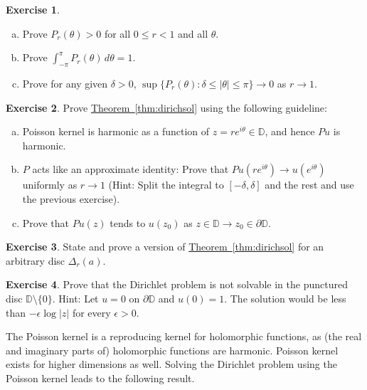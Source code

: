 \documentclass[12pt,openany]{book}
\newcommand{\sabs}[1]{\lvert {#1} \rvert}
\newcommand{\abs}[1]{\left\lvert {#1} \right\rvert}
\newcommand{\D}{{\mathbb{D}}}
\theoremstyle{plain}
\theoremstyle{remark}
\theoremstyle{definition}
\newenvironment{exbox}{%
    \def\FrameCommand{\vrule width 1pt \relax\hspace{10pt}}%
    \MakeFramed {\advance \hsize -\width \FrameRestore}%
}{%
    \endMakeFramed
}
\newenvironment{exparts}{%
    \leavevmode\begin{enumerate}[a),noitemsep,topsep=0pt,parsep=0pt,partopsep=0pt]
}{%
    \end{enumerate}
}
\theoremstyle{exercise}
\newtheorem{exercise}{Exercise}[section]
\theoremstyle{example}
\newcommand{\thmref}[1]{\hyperref[#1]{Theorem~\ref*{#1}}}
\begin{document}
\begin{exbox}
\begin{exercise}
\begin{exparts}
\item
Prove $P_r(\theta) > 0$ for all $0 \leq r < 1$ and all $\theta$.
\item
Prove $\int_{-\pi}^{\pi} P_r(\theta) \, d\theta = 1$.
\item
Prove for any given $\delta > 0$,
$\sup \{P_r(\theta) : \delta \leq \abs{\theta} \leq \pi \} \to 0$ as
$r \to 1$.
\end{exparts}
\end{exercise}

\begin{exercise}
\pagebreak[1]%
Prove \thmref{thm:dirichsol} using the following guideline:
\begin{exparts}
\item
Poisson kernel is harmonic
as a function of $z=re^{i\theta} \in \D$, and hence
$Pu$ is harmonic.
\item
$P$ acts like an
approximate identity: Prove that
$Pu(re^{i\theta}) \to u(e^{i\theta})$ uniformly as
$r \to 1$ (Hint: Split the integral to $[-\delta,\delta]$ and the rest
and use the previous exercise).
\item
Prove that $Pu(z)$ tends to $u(z_0)$ as
$z \in \D \to z_0 \in \partial \D$.
\pagebreak[2]
\end{exparts}
\end{exercise}

\begin{exercise}
State and prove a version of \thmref{thm:dirichsol} for an arbitrary disc
$\Delta_r(a)$.
\end{exercise}

\begin{exercise}
Prove that the Dirichlet problem is not solvable in the punctured disc $\D
\setminus \{ 0 \}$.
Hint: Let $u = 0$ on $\partial \D$ and $u(0)=1$.
The solution would be
less than $- \epsilon \log \sabs{z}$ for every $\epsilon > 0$.
\end{exercise}
\end{exbox}

The Poisson kernel is a reproducing kernel for
holomorphic functions, as (the real and imaginary parts of) holomorphic functions are harmonic.
Poisson kernel exists for higher dimensions as well.
Solving the Dirichlet problem using the Poisson kernel leads to
the following result.
\end{document}
